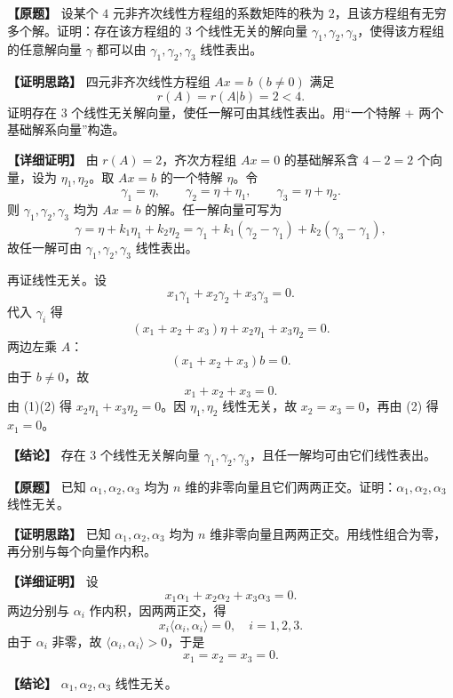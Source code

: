 \documentclass[11pt,a4paper,UTF8]{ctexart}
\begin{document}
\begin{answerbox}
\textbf{【原题】} 设某个 $4$ 元非齐次线性方程组的系数矩阵的秩为 $2$，且该方程组有无穷多个解。证明：存在该方程组的 $3$ 个线性无关的解向量 $\gamma_1,\gamma_2,\gamma_3$，使得该方程组的任意解向量 $\gamma$ 都可以由 $\gamma_1,\gamma_2,\gamma_3$ 线性表出。

\textbf{【证明思路】} 四元非齐次线性方程组 $Ax=b\ (b\ne0)$ 满足
\[
r(A)=r(A|b)=2<4.
\]
证明存在 $3$ 个线性无关解向量，使任一解可由其线性表出。用“一个特解 + 两个基础解系向量”构造。

\textbf{【详细证明】} 由 $r(A)=2$，齐次方程组 $Ax=0$ 的基础解系含 $4-2=2$ 个向量，设为 $\eta_1,\eta_2$。取 $Ax=b$ 的一个特解 $\eta$。令
\[
\gamma_1=\eta,\qquad
\gamma_2=\eta+\eta_1,\qquad
\gamma_3=\eta+\eta_2.
\]
则 $\gamma_1,\gamma_2,\gamma_3$ 均为 $Ax=b$ 的解。任一解向量可写为
\[
\gamma=\eta+k_1\eta_1+k_2\eta_2
=\gamma_1+k_1(\gamma_2-\gamma_1)+k_2(\gamma_3-\gamma_1),
\]
故任一解可由 $\gamma_1,\gamma_2,\gamma_3$ 线性表出。

再证线性无关。设
\[
x_1\gamma_1+x_2\gamma_2+x_3\gamma_3=0.
\]
代入 $\gamma_i$ 得
\[
(x_1+x_2+x_3)\eta+x_2\eta_1+x_3\eta_2=0. \tag{1}
\]
两边左乘 $A$：
\[
(x_1+x_2+x_3)b=0.
\]
由于 $b\ne0$，故
\[
x_1+x_2+x_3=0. \tag{2}
\]
由 (1)(2) 得 $x_2\eta_1+x_3\eta_2=0$。因 $\eta_1,\eta_2$ 线性无关，故 $x_2=x_3=0$，再由 (2) 得 $x_1=0$。

\textbf{【结论】} 存在 $3$ 个线性无关解向量 $\gamma_1,\gamma_2,\gamma_3$，且任一解均可由它们线性表出。
\end{answerbox}

\begin{answerbox}
\textbf{【原题】} 已知 $\alpha_1,\alpha_2,\alpha_3$ 均为 $n$ 维的非零向量且它们两两正交。证明：$\alpha_1,\alpha_2,\alpha_3$ 线性无关。

\textbf{【证明思路】} 已知 $\alpha_1,\alpha_2,\alpha_3$ 均为 $n$ 维非零向量且两两正交。用线性组合为零，再分别与每个向量作内积。

\textbf{【详细证明】} 设
\[
x_1\alpha_1+x_2\alpha_2+x_3\alpha_3=0.
\]
两边分别与 $\alpha_i$ 作内积，因两两正交，得
\[
x_i\langle\alpha_i,\alpha_i\rangle=0,\quad i=1,2,3.
\]
由于 $\alpha_i$ 非零，故 $\langle\alpha_i,\alpha_i\rangle>0$，于是
\[
x_1=x_2=x_3=0.
\]

\textbf{【结论】} $\alpha_1,\alpha_2,\alpha_3$ 线性无关。
\end{answerbox}
\end{document}
